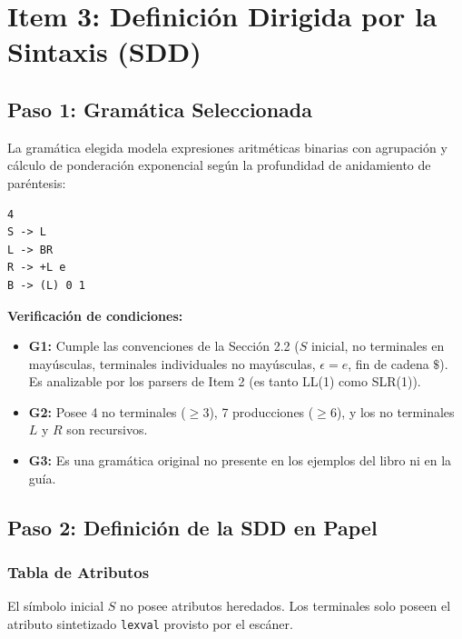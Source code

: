 \documentclass[11pt,a4paper]{article}
\begin{document}
\newpage
\section{Item 3: Definición Dirigida por la Sintaxis (SDD)}

\subsection{Paso 1: Gramática Seleccionada}

La gramática elegida modela expresiones aritméticas binarias con agrupación y cálculo de ponderación exponencial según la profundidad de anidamiento de paréntesis:

\begin{lstlisting}
4
S -> L
L -> BR
R -> +L e
B -> (L) 0 1
\end{lstlisting}

\textbf{Verificación de condiciones:}
\begin{itemize}
    \item \textbf{G1:} Cumple las convenciones de la Sección 2.2 ($S$ inicial, no terminales en mayúsculas, terminales individuales no mayúsculas, $\epsilon=e$, fin de cadena $\$$). Es analizable por los parsers de Item 2 (es tanto LL(1) como SLR(1)).
    \item \textbf{G2:} Posee 4 no terminales ($\ge 3$), 7 producciones ($\ge 6$), y los no terminales $L$ y $R$ son recursivos.
    \item \textbf{G3:} Es una gramática original no presente en los ejemplos del libro ni en la guía.
\end{itemize}

\subsection{Paso 2: Definición de la SDD en Papel}

\subsubsection{Tabla de Atributos}

El símbolo inicial $S$ no posee atributos heredados. Los terminales solo poseen el atributo sintetizado \texttt{lexval} provisto por el escáner.
\end{document}
